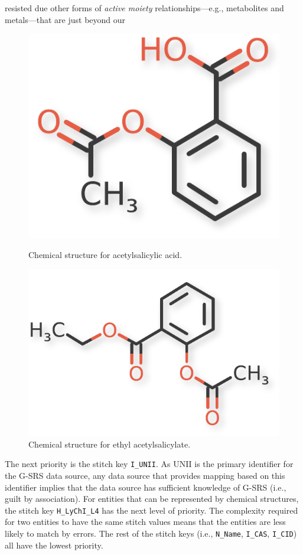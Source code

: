 \documentclass{bioinfo}
\begin{document}
\begin{methods}
resisted due other forms of \emph{active moiety} relationships---e.g.,
metabolites and metals---that are just beyond our 
\begin{figure}[!tpb]
\centering
\begin{minipage}{.45\textwidth}
\centerline{\includegraphics[scale=0.5]{aspirin-crop}}
\caption{Chemical structure for acetylsalicylic
acid.}\label{fig:aspirin}
\end{minipage}
\hfill
\begin{minipage}{.45\textwidth}
\centerline{\includegraphics[scale=0.5]{VX19C5613T-crop}}
\caption{Chemical structure for ethyl acetylsalicylate.}\label{fig:ethyl}
\end{minipage}
\end{figure}

The next priority is the stitch key \texttt{I\_UNII}. As UNII is
the primary identifier for the G-SRS data source, any data source that
provides mapping based on this identifier implies that the data source has
sufficient knowledge of G-SRS (i.e., guilt by association). For
entities that can be represented by chemical structures, the stitch
key \texttt{H\_LyChI\_L4} has the next level of priority. The
complexity required for two entities to have the same stitch values
means that the entities are less likely to match by errors. The rest
of the stitch keys
(i.e., \texttt{N\_Name}, \texttt{I\_CAS}, \texttt{I\_CID}) all have the
lowest priority.


\end{methods}
\end{document}
